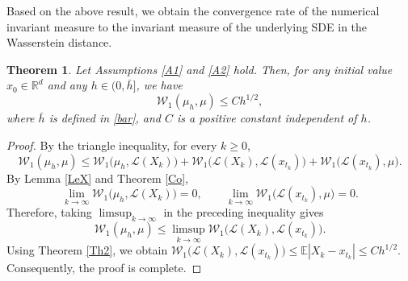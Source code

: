 \documentclass[aap]{imsart}
\theoremstyle{plain}
\newtheorem{theorem}{Theorem}[section]
\theoremstyle{definition}
\begin{document}
			Based on the above result, we obtain the convergence rate of the
			numerical invariant measure to the invariant measure of the underlying
			SDE in the Wasserstein distance.
			
			\begin{theorem}\label{Th3}
				Let Assumptions \ref{A1} and \ref{A2} hold. Then, for any initial value
				\(x_0\in\mathbb R^d\) and any \(h\in(0,\bar h]\), we have
				\[
				\mathcal W_1(\mu_h,\mu)
				\leqslant
				C h^{1/2},
				\]
				where \(\bar h\) is defined in \eqref{bar}, and \(C\) is a positive
				constant independent of \(h\).
			\end{theorem}
			
			\begin{proof}
				By the triangle inequality, for every \(k\geqslant 0\),
				\[\mathcal W_1(\mu_h,\mu)
					\leqslant
					\mathcal W_1\bigl(\mu_h,\mathcal L(X_k)\bigr)
					+
					\mathcal W_1\bigl(\mathcal L(X_k),\mathcal L(x_{t_k})\bigr)+
					\mathcal W_1\bigl(\mathcal L(x_{t_k}),\mu\bigr).\]
				By Lemma \ref{LeX} and Theorem \ref{Co},
				\[\lim_{k\to\infty}
				\mathcal W_1\bigl(\mu_h,\mathcal L(X_k)\bigr)
				=0,\qquad \lim_{k\to\infty}
				\mathcal W_1\bigl(\mathcal L(x_{t_k}),\mu\bigr)
				=0.\]
				Therefore, taking \(\limsup_{k\to\infty}\) in the preceding inequality
				gives
				\[\mathcal W_1(\mu_h,\mu)
				\leqslant
				\limsup_{k\to\infty}
				\mathcal W_1\bigl(\mathcal L(X_k),\mathcal L(x_{t_k})\bigr).\]
				Using Theorem \ref{Th2}, we obtain \(\mathcal W_1\bigl(\mathcal L(X_k),\mathcal L(x_{t_k})\bigr)
				\leqslant\mathbb E\left|X_k-x_{t_k}\right|
				\leqslant C h^{1/2}\).
				Consequently, the proof is complete.
			\end{proof}
			
\end{document}
